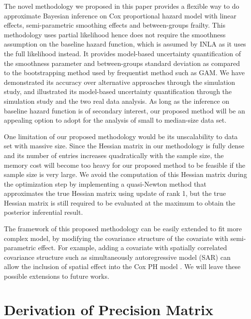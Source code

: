 \documentclass[]{article}
\begin{document}
The novel methodology we proposed in this paper provides a flexible way to do approximate Bayesian inference on Cox proportional hazard model with linear effects, semi-parametric smoothing effects and between-groups frailty. This methodology uses partial likelihood hence does not require the smoothness assumption on the baseline hazard function, which is assumed by INLA as it uses the full likelihood instead. It provides model-based uncertainty quantification of the smoothness parameter and between-groups standard deviation as compared to the bootstrapping method used by frequentist method such as GAM. We have demonstrated its accuracy over alternative approaches through the simulation study, and illustrated its model-based uncertainty quantification through the simulation study and the two real data analysis. As long as the inference on baseline hazard function is of secondary interest, our proposed method will be an appealing option to adopt for the analysis of small to median-size data set.

One limitation of our proposed methodology would be its unscalability to data set with massive size. Since the Hessian matrix in our methodology is fully dense and its number of entries increases quadratically with the sample size, the memory cost will become too heavy for our proposed method to be feasible if the sample size is very large. We avoid the computation of this Hessian matrix during the optimization step by implementing a quasi-Newton method that approximates the true Hessian matrix using update of rank 1, but the true Hessian matrix is still required to be evaluated at the maximum to obtain the posterior inferential result. 

The framework of this proposed methodology can be easily extended to fit more complex model, by modifying the covariance structure of the covariate with semi-parametric effect. For example, adding a covariate with spatially correlated covariance structure such as simultaneously autoregressive model (SAR) can allow the inclusion of spatial effect into the Cox PH model \citep{Spatial}. We will leave these possible extensions to future works.

\newpage




\appendix

\section{Derivation of Precision Matrix}
\end{document}
